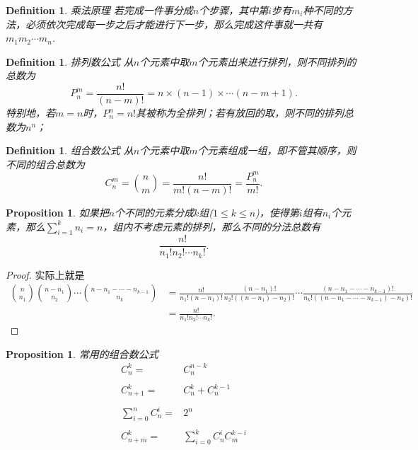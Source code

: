\documentclass{article}
\newtheorem{proposition}[theorem]{Proposition}
\newtheorem{definition}[theorem]{Definition}
\begin{document}
\begin{definition}
\rm {\color{red} 乘法原理} 若完成一件事分成$n$个步骤，其中第$i$步有$m_i$种不同的方法，必须依次完成每一步之后才能进行下一步，那么完成这件事就一共有$m_1m_2\cdots m_n$.
\end{definition}


\begin{definition}
\rm {\color{red} 排列数公式} 从$n$个元素中取$m$个元素出来进行排列，则不同排列的总数为
$$
P^m_n = \frac{n!}{(n-m)!} = n\times(n-1)\times\cdots(n-m+1).
$$
特别地，若$m=n$时，$P^n_n = n!$其被称为{\color{red}全排列}；若有放回的取，则不同的排列总数为$n^n$；
\end{definition}

\begin{definition}
\rm {\color{red} 组合数公式} 从$n$个元素中取$m$个元素组成一组，即不管其顺序，则不同的组合总数为
$$
C^m_n = \binom nm  = \frac{n!}{m!(n-m)!} = \frac{P^m_n}{m!}. 
$$
\end{definition}

\begin{proposition}
\rm 如果把$n$个不同的元素分成$k$组($1\leq k \leq n$)，使得第$i$组有$n_i$个元素，那么$\sum\limits_{i=1}^k n_i = n$，组内不考虑元素的排列，那么不同的分法总数有
$$
\frac{n!}{n_1!n_2!\cdots n_k!}.
$$
\end{proposition}

\begin{proof}
实际上就是
$$
\begin{array}{ll}
\binom {n}{n_1} \binom{n-n_1}{n_2} \cdots \binom{n-n_1-\cdots-n_{k-1}}{n_k} &= \frac{n!}{n_1!(n-n_1)!} \frac{(n-n_1)!}{n_2!((n-n_1)-n_2)!}\cdots \frac{(n-n_1-\cdots-n_{k-1})!}{n_k!((n-n_1-\cdots-n_{k-1})-n_{k})!} \\
&= \frac{n!}{n_1!n_2!\cdots n_k!}.
\end{array}
$$
\end{proof}

\begin{proposition}
\rm {\color{red} 常用的组合数公式}
$$
\begin{array}{rl}
C^k_n =& C^{n-k}_n \\ \\
C^k_{n+1} =& C^k_n + C^{k-1}_n \\ \\
\sum\limits_{i=0}^n C^i_n =& 2^n \\ \\
C^k_{n+m} =& \sum\limits_{i=0}^k C^i_n C^{k-i}_m \\ \\
\end{array}
$$
\end{proposition}
\end{document}
